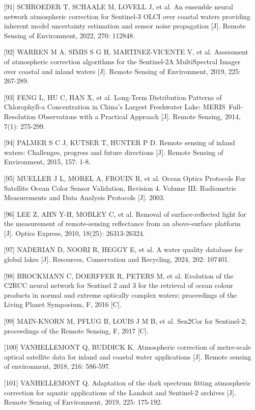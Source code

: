\documentclass[
  12pt,
]{article}
\begin{document}
{[}91{]} SCHROEDER T, SCHAALE M, LOVELL J, et al. An ensemble neural
network atmospheric correction for Sentinel-3 OLCI over coastal waters
providing inherent model uncertainty estimation and sensor noise
propagation {[}J{]}. Remote Sensing of Environment, 2022, 270: 112848.

{[}92{]} WARREN M A, SIMIS S G H, MARTINEZ-VICENTE V, et al. Assessment
of atmospheric correction algorithms for the Sentinel-2A MultiSpectral
Imager over coastal and inland waters {[}J{]}. Remote Sensing of
Environment, 2019, 225: 267-289.

{[}93{]} FENG L, HU C, HAN X, et al. Long-Term Distribution Patterns of
Chlorophyll-a Concentration in China's Largest Freshwater Lake:
MERIS~Full-Resolution Observations with a Practical Approach {[}J{]}.
Remote Sensing, 2014, 7(1): 275-299.

{[}94{]} PALMER S C J, KUTSER T, HUNTER P D. Remote sensing of inland
waters: Challenges, progress and future directions {[}J{]}. Remote
Sensing of Environment, 2015, 157: 1-8.

{[}95{]} MUELLER J L, MOREL A, FROUIN R, et al. Ocean Optics Protocols
For Satellite Ocean Color Sensor Validation, Revision 4. Volume III:
Radiometric Measurements and Data Analysis Protocols {[}J{]}. 2003.

{[}96{]} LEE Z, AHN Y-H, MOBLEY C, et al. Removal of surface-reflected
light for the measurement of remote-sensing reflectance from an
above-surface platform {[}J{]}. Optics Express, 2010, 18(25):
26313-26324.

{[}97{]} NADERIAN D, NOORI R, HEGGY E, et al. A water quality database
for global lakes {[}J{]}. Resources, Conservation and Recycling, 2024,
202: 107401.

{[}98{]} BROCKMANN C, DOERFFER R, PETERS M, et al. Evolution of the
C2RCC neural network for Sentinel 2 and 3 for the retrieval of ocean
colour products in normal and extreme optically complex waters;
proceedings of the Living Planet Symposium, F, 2016 {[}C{]}.

{[}99{]} MAIN-KNORN M, PFLUG B, LOUIS J M B, et al. Sen2Cor for
Sentinel-2; proceedings of the Remote Sensing, F, 2017 {[}C{]}.

{[}100{]} VANHELLEMONT Q, RUDDICK K. Atmospheric correction of
metre-scale optical satellite data for inland and coastal water
applications {[}J{]}. Remote sensing of environment, 2018, 216: 586-597.

{[}101{]} VANHELLEMONT Q. Adaptation of the dark spectrum fitting
atmospheric correction for aquatic applications of the Landsat and
Sentinel-2 archives {[}J{]}. Remote Sensing of Environment, 2019, 225:
175-192.
\end{document}
